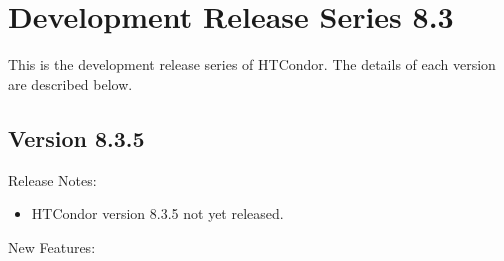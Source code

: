 
\section{\label{sec:History-8-3}Development Release Series 8.3}

This is the development release series of HTCondor.
The details of each version are described below.

\subsection*{\label{sec:New-8-3-5}Version 8.3.5}

\noindent Release Notes:

\begin{itemize}

\item HTCondor version 8.3.5 not yet released.

\end{itemize}


\noindent New Features:

